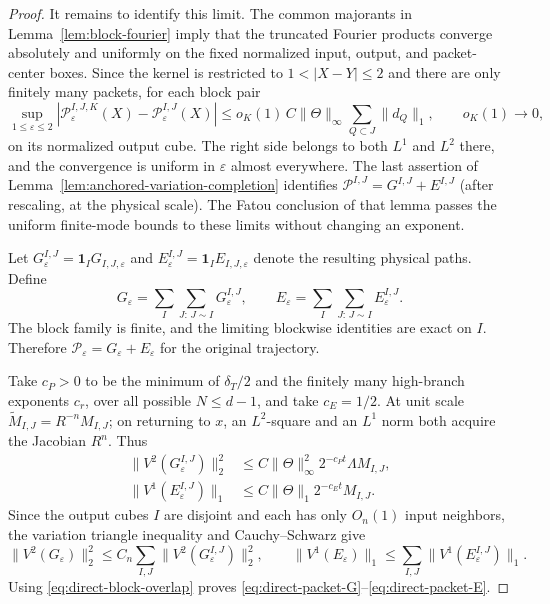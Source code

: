 \documentclass[11pt]{article}
\numberwithin{equation}{section}
\theoremstyle{remark}
\theoremstyle{definition}
\newcommand{\norm}[1]{\lVert #1\rVert}
\begin{document}
\begin{proof}
It remains to identify this limit.  The common majorants in
Lemma~\ref{lem:block-fourier} imply that the truncated Fourier products
converge absolutely and uniformly on the fixed normalized input, output, and
packet-center boxes.  Since the kernel is restricted to $1<|X-Y|\le2$ and
there are only finitely many packets, for each block pair
\[
 \sup_{1\le\varepsilon\le2}
 |\mathcal P^{I,J,K}_\varepsilon(X)
   -\mathcal P^{I,J}_\varepsilon(X)|
 \le o_K(1)\,C\norm\Theta_\infty
       \sum_{Q\subset J}\norm{d_Q}_1,
 \qquad o_K(1)\longrightarrow0,
\]
on its normalized output cube.  The right side belongs to both $L^1$ and
$L^2$ there, and the convergence is uniform in $\varepsilon$ almost
everywhere.  The last assertion of
Lemma~\ref{lem:anchored-variation-completion} identifies
$\mathcal P^{I,J}=G^{I,J}+E^{I,J}$ (after rescaling, at the physical scale).
The Fatou conclusion of that lemma passes the uniform finite-mode bounds
to these limits without changing an exponent.

Let $G^{I,J}_\varepsilon=\mathbf1_I G_{I,J,\varepsilon}$ and
$E^{I,J}_\varepsilon=\mathbf1_I E_{I,J,\varepsilon}$ denote the resulting
physical paths.  Define
\[
 G_\varepsilon=\sum_I\sum_{J:\,J\sim I}G^{I,J}_\varepsilon,
 \qquad
 E_\varepsilon=\sum_I\sum_{J:\,J\sim I}E^{I,J}_\varepsilon.
\]
The block family is finite, and the limiting blockwise identities are exact
on $I$.  Therefore
$\mathcal P_\varepsilon=G_\varepsilon+E_\varepsilon$ for the original
trajectory.

Take $c_P>0$ to be the minimum of $\delta_T/2$ and the finitely many
high-branch exponents $c_r$, over all possible $N\le d-1$, and take
$c_E=1/2$.  At unit scale
$\widetilde M_{I,J}=R^{-n}M_{I,J}$; on returning to $x$, an
$L^2$-square and an $L^1$ norm both acquire the Jacobian $R^n$.  Thus
\begin{align*}
 \norm{V^2(G^{I,J}_\varepsilon)}_2^2
 &\le C\norm\Theta_\infty^2
       2^{-c_Pt}\Lambda M_{I,J},\\
 \norm{V^1(E^{I,J}_\varepsilon)}_1
 &\le C\norm\Theta_1
       2^{-c_Et}M_{I,J}.
\end{align*}
Since the output cubes $I$ are disjoint and each has only $O_n(1)$ input
neighbors, the variation triangle inequality and Cauchy--Schwarz give
\[
 \norm{V^2(G_\varepsilon)}_2^2
 \le C_n\sum_{I,J}\norm{V^2(G^{I,J}_\varepsilon)}_2^2,
 \qquad
 \norm{V^1(E_\varepsilon)}_1
 \le\sum_{I,J}\norm{V^1(E^{I,J}_\varepsilon)}_1.
\]
Using \eqref{eq:direct-block-overlap} proves
\eqref{eq:direct-packet-G}--\eqref{eq:direct-packet-E}.
\end{proof}
\end{document}
